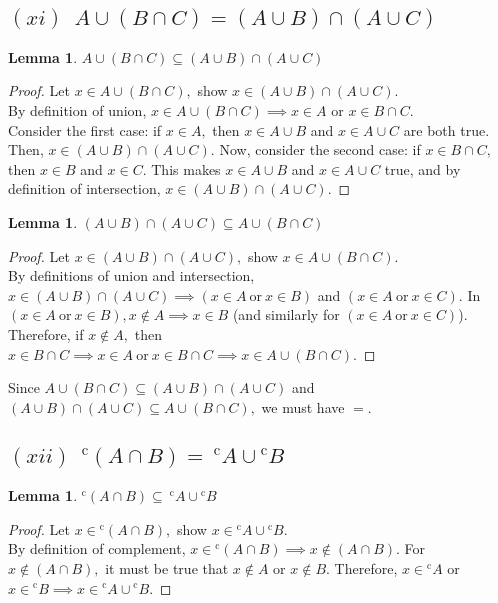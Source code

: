 \documentclass[12pt]{article}
\newtheorem{lemma}[theorem]{Lemma}
\theoremstyle{definition}
\numberwithin{equation}{subsection}
\begin{document}
\subsection*{$(xi) \enspace A \cup (B \cap C) = (A \cup B) \cap (A \cup C)$}
\begin{lemma}
$A \cup (B \cap C) \subseteq (A \cup B) \cap (A \cup C)$
\end{lemma}
\begin{proof}
Let $x \in A \cup (B \cap C),$ show $x \in (A \cup B) \cap (A \cup C).$\\
By definition of union, $x \in A \cup (B \cap C) \implies x \in A$ or $x \in B \cap C.$\\ Consider the first case: if $x \in A,$ then $x \in A \cup B$ and $x \in A \cup C$ are both true. Then, $x \in (A \cup B) \cap (A \cup C).$ Now, consider the second case: if $x \in B \cap C,$ then $x \in B$ and $x \in C.$ This makes $x \in A \cup B$ and $x \in A \cup C$ true, and by definition of intersection, $x \in (A \cup B) \cap (A \cup C).$
\end{proof}
\begin{lemma}
$(A \cup B) \cap (A \cup C) \subseteq A \cup (B \cap C)$
\end{lemma}
\begin{proof}
Let $x \in (A \cup B) \cap (A \cup C),$ show $x \in A \cup (B \cap C).$\\
By definitions of union and intersection, $x \in (A \cup B) \cap (A \cup C) \implies (x \in A \ \text{or} \ x \in B)$ and $(x \in A \ \text{or} \ x \in C).$ In $(x \in A \ \text{or} \ x \in B), x \notin A \implies x \in B$ (and similarly for $(x \in A \ \text{or} \ x \in C)$). Therefore, if $x \notin A,$ then $x \in B \cap C \implies x \in A \ \text{or} \ x \in B \cap C \implies x \in A \cup (B \cap C).$
\end{proof}
Since $A \cup (B \cap C) \subseteq (A \cup B) \cap (A \cup C)$ and $(A \cup B) \cap (A \cup C) \subseteq A \cup (B \cap C),$ we must have $=.$

\subsection*{$(xii) \enspace {^{\mathrm{c}}}(A \cap B) = \ {^{\mathrm{c}}}{A} \cup {^{\mathrm{c}}}{B} $}
\begin{lemma}
${^{\mathrm{c}}}(A \cap B) \subseteq \ {^{\mathrm{c}}}{A} \cup {^{\mathrm{c}}}{B} $
\end{lemma}
\begin{proof}
Let $x \in {^{\mathrm{c}}}(A \cap B),$ show $x \in {^{\mathrm{c}}}{A} \cup {^{\mathrm{c}}}{B}.$\\
By definition of complement,  $x \in {^{\mathrm{c}}}(A \cap B) \implies x \notin (A \cap B).$ For $x \notin (A \cap B),$ it must be true that $x \notin A$ or $x \notin B.$ Therefore, $x \in  {^{\mathrm{c}}}{A}$ or $x \in {^{\mathrm{c}}}{B} \implies x \in  {^{\mathrm{c}}}{A} \cup  {^{\mathrm{c}}}{B}.$
\end{proof}
\end{document}
